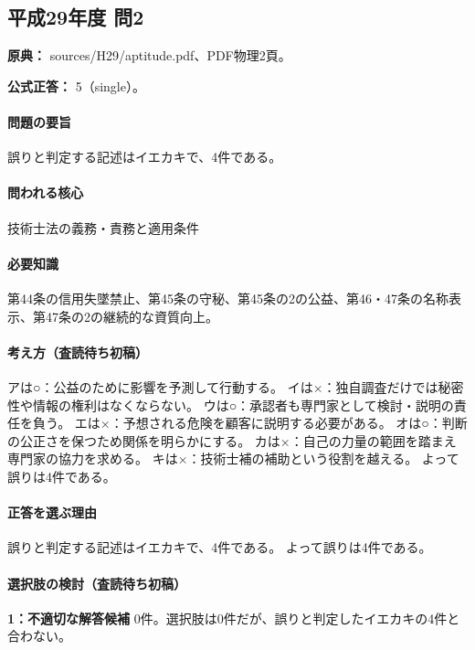\subsection{平成29年度 問2}
\label{q:h29-reg-apt-02}

\noindent\textbf{原典：} sources/H29/aptitude.pdf、PDF物理2頁。

\textbf{公式正答：} 5（single）。

\paragraph{問題の要旨} 誤りと判定する記述はイエカキで、4件である。

\paragraph{問われる核心} 技術士法の義務・責務と適用条件

\paragraph{必要知識} 第44条の信用失墜禁止、第45条の守秘、第45条の2の公益、第46・47条の名称表示、第47条の2の継続的な資質向上。

\paragraph{考え方（査読待ち初稿）} アは○：公益のために影響を予測して行動する。 イは×：独自調査だけでは秘密性や情報の権利はなくならない。 ウは○：承認者も専門家として検討・説明の責任を負う。 エは×：予想される危険を顧客に説明する必要がある。 オは○：判断の公正さを保つため関係を明らかにする。 カは×：自己の力量の範囲を踏まえ専門家の協力を求める。 キは×：技術士補の補助という役割を越える。 よって誤りは4件である。

\paragraph{正答を選ぶ理由} 誤りと判定する記述はイエカキで、4件である。  よって誤りは4件である。

\paragraph{選択肢の検討（査読待ち初稿）}\mbox{}\par

\noindent\textbf{1：不適切な解答候補} 0件。選択肢は0件だが、誤りと判定したイエカキの4件と合わない。\par

